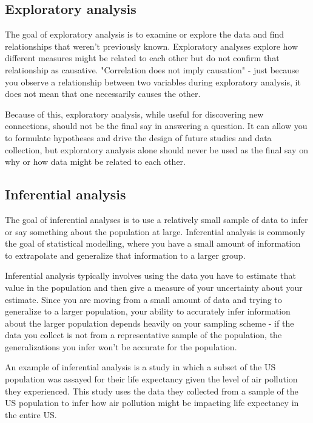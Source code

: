 \documentclass[11pt,fancy]{elegantbook}
\begin{document}
\subsection{Exploratory analysis}
The goal of exploratory analysis is to examine or explore the data and find relationships that weren't previously known. Exploratory analyses explore how different measures might be related to each other but do not confirm that relationship as causative. "Correlation does not imply causation" - just because you observe a relationship between two variables during exploratory analysis, it does not mean that one necessarily causes the other.
\par Because of this, exploratory analysis, while useful for discovering new connections, should not be the final say in answering a question. It can allow you to formulate hypotheses and drive the design of future studies and data collection, but exploratory analysis alone should never be used as the final say on why or how data might be related to each other.

\subsection{Inferential analysis}
The goal of inferential analyses is to use a relatively small sample of data to infer or say something about the population at large. Inferential analysis is commonly the goal of statistical modelling, where you have a small amount of information to extrapolate and generalize that information to a larger group.
\par Inferential analysis typically involves using the data you have to estimate that value in the population and then give a measure of your uncertainty about your estimate. Since you are moving from a small amount of data and trying to generalize to a larger population, your ability to accurately infer information about the larger population depends heavily on your sampling scheme - if the data you collect is not from a representative sample of the population, the generalizations you infer won't be accurate for the population.
\par An example of inferential analysis is a study in which a subset of the US population was assayed for their life expectancy given the level of air pollution they experienced. This study uses the data they collected from a sample of the US population to infer how air pollution might be impacting life expectancy in the entire US.
\end{document}
